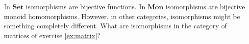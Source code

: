 \documentclass{scrartcl}
\begin{document}
\begin{enumerate}
  In $\mathbf{Set}$ isomorphisms are bijective functions.
  In $\mathbf{Mon}$ isomorphisms are bijective monoid homomorphisms.
  However, in other categories, isomorphisms might be something completely different.
  What are isomorphisms in the category of matrices of exercise \ref{ex:matrix}?
\end{enumerate}



\end{document}
